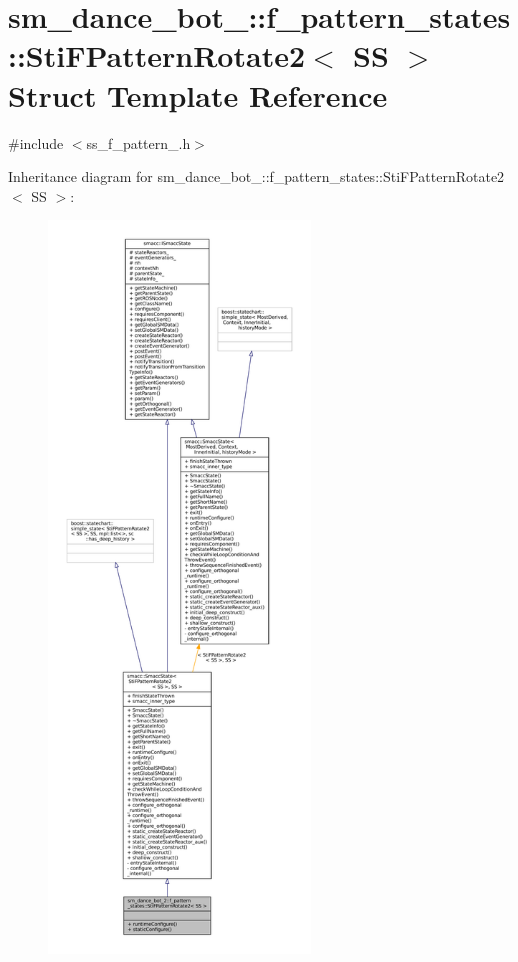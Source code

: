 \hypertarget{classsm__dance__bot__2_1_1f__pattern__states_1_1StiFPatternRotate2}{}\section{sm\+\_\+dance\+\_\+bot\+\_\+:\+:f\+\_\+pattern\+\_\+states\+:\+:Sti\+F\+Pattern\+Rotate2$<$ SS $>$ Struct Template Reference}
\label{classsm__dance__bot__2_1_1f__pattern__states_1_1StiFPatternRotate2}


{\ttfamily \#include $<$ss\+\_\+f\+\_\+pattern\+\_.\+h$>$}



Inheritance diagram for sm\+\_\+dance\+\_\+bot\+\_\+:\+:f\+\_\+pattern\+\_\+states\+:\+:Sti\+F\+Pattern\+Rotate2$<$ SS $>$\+:
\nopagebreak
\begin{figure}[H]
\begin{center}
\leavevmode
\includegraphics[height=550pt]{classsm__dance__bot__2_1_1f__pattern__states_1_1StiFPatternRotate2__inherit__graph}
\end{center}
\end{figure}


